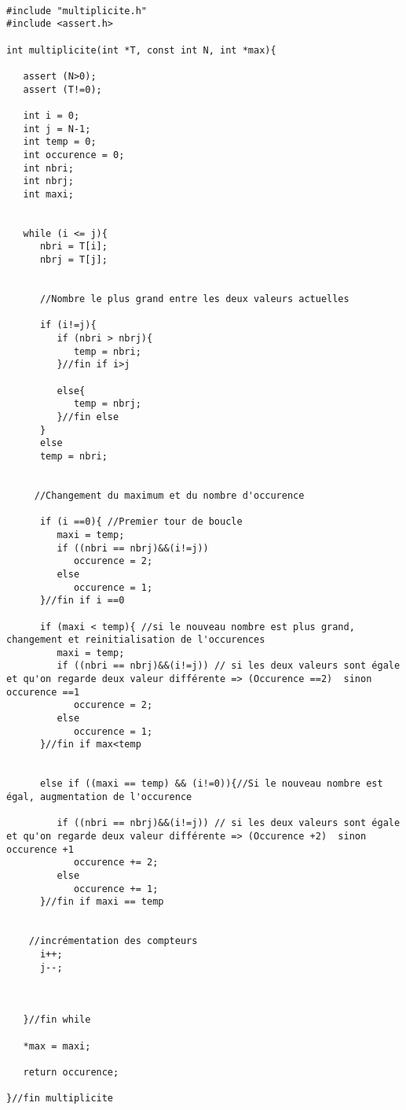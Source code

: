 \documentclass[a4paper, 11pt, oneside]{article}
\begin{document}
\begin{lstlisting}[caption={multiplicite.c}]

#include "multiplicite.h"
#include <assert.h>

int multiplicite(int *T, const int N, int *max){

   assert (N>0);
   assert (T!=0);

   int i = 0;
   int j = N-1;
   int temp = 0;
   int occurence = 0;
   int nbri;
   int nbrj;
   int maxi;


   while (i <= j){
      nbri = T[i];
      nbrj = T[j];


      //Nombre le plus grand entre les deux valeurs actuelles

      if (i!=j){
         if (nbri > nbrj){
            temp = nbri;
         }//fin if i>j

         else{
            temp = nbrj;
         }//fin else
      }
      else
      temp = nbri;


     //Changement du maximum et du nombre d'occurence

      if (i ==0){ //Premier tour de boucle
         maxi = temp;
         if ((nbri == nbrj)&&(i!=j))
            occurence = 2;
         else
            occurence = 1;
      }//fin if i ==0

      if (maxi < temp){ //si le nouveau nombre est plus grand, changement et reinitialisation de l'occurences
         maxi = temp;
         if ((nbri == nbrj)&&(i!=j)) // si les deux valeurs sont égale et qu'on regarde deux valeur différente => (Occurence ==2)  sinon occurence ==1
            occurence = 2;
         else
            occurence = 1;
      }//fin if max<temp


      else if ((maxi == temp) && (i!=0)){//Si le nouveau nombre est égal, augmentation de l'occurence

         if ((nbri == nbrj)&&(i!=j)) // si les deux valeurs sont égale et qu'on regarde deux valeur différente => (Occurence +2)  sinon occurence +1
            occurence += 2;
         else
            occurence += 1;
      }//fin if maxi == temp


    //incrémentation des compteurs
      i++;
      j--;



   }//fin while

   *max = maxi;

   return occurence;

}//fin multiplicite


\end{lstlisting}
\end{document}
